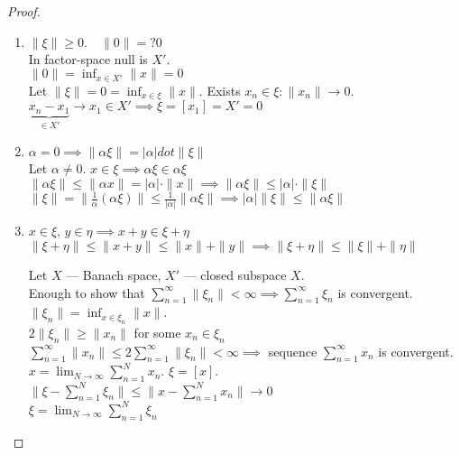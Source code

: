 \begin{proof}
  \begin{enumerate}
    \item
      $\|\xi\| \ge 0. \quad \|0\| =? 0$\\
      In factor-space null is $X'$.\\
      $\|0\| = \inf_{x \in  X'} \|x\| = 0$\\
      Let $\|\xi\| = 0 = \inf_{x\in \xi} \|x\|$. Exists $x_n \in  \xi: \|x_n\| \to 0$.\\
      $\underbrace{x_n - x_1}_{\in  X'} \to  x_1 \in  X' \implies \xi = [x_1] = X' = 0$

    \item $\alpha = 0 \implies \|\alpha \xi\| = \left| \alpha \right| dot \|\xi\|$ \\
      Let $\alpha \neq  0$. $x \in  \xi \implies \alpha \xi \in  \alpha \xi$\\
      $\|\alpha \xi\| \le  \|\alpha x\| = \left| \alpha \right| \cdot \|x\| \implies \|\alpha \xi\| \le \left| \alpha \right| \cdot \|\xi\|$\\
      $\|\xi\| = \|\frac{1}{\alpha}(\alpha \xi)\| \le  \frac{1}{\left| \alpha \right|}\|\alpha \xi\| \implies \left| \alpha \right| \|\xi\| \le  \|\alpha \xi\|$ 


      \item
        $x \in  \xi$, $y \in  \eta \implies x + y \in  \xi + \eta$ \\
        $\|\xi + \eta\| \le  \|x+y\| \le \|x\| + \|y\| \implies \|\xi + \eta\|\le \|\xi\| + \|\eta\|$

        Let $X$ --- Banach space, $X'$ --- closed subspace $X$.\\
        Enough to show that $\sum_{n=1}^{\infty} \|\xi_n\| < \infty \implies \sum_{n=1}^{\infty} \xi_n$ is convergent.\\
        $\|\xi_n\| = \inf_{x \in  \xi_n} \|x\|$.\\
        $2 \|\xi_n\| \ge  \|x_n\|$ for some $x_n \in  \xi_n$\\
        $\sum_{n=1}^{\infty} \|x_n\| \le 2 \sum_{n=1}^{\infty} \|\xi_n\| < \infty \implies$ sequence $\sum_{n=1}^{\infty} x_n$ is convergent.\\
        $x = \lim_{N \to \infty} \sum_{n=1}^{N} x_n$. $\xi = [x]$.
         $\|\xi - \sum_{n=1}^{N} \xi_n\| \le  \|x - \sum_{n=1}^{N} x_n\| \to 0$ \\
         $\xi = \lim_{N \to \infty} \sum_{n=1}^{N} \xi_n$
  \end{enumerate}
\end{proof}


